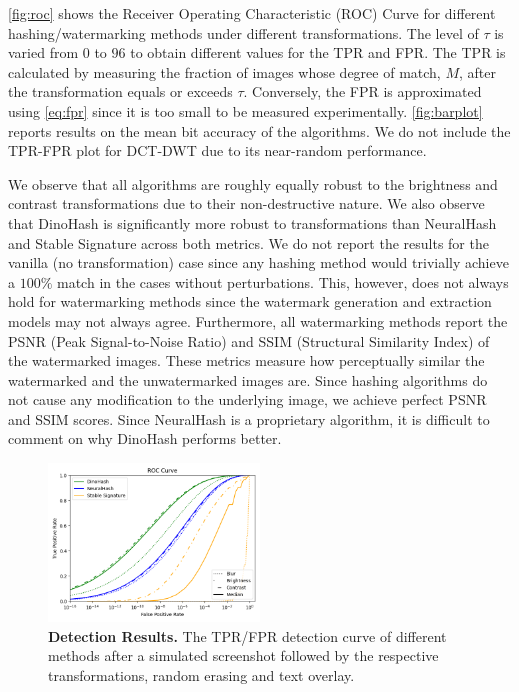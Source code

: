 \autoref{fig:roc} shows the Receiver Operating Characteristic (ROC) Curve for different hashing/watermarking methods under different transformations. The level of $\tau$ is varied from $0$ to $96$ to obtain different values for the TPR and FPR. The TPR is calculated by measuring the fraction of images whose degree of match, $M$, after the transformation equals or exceeds $\tau$. Conversely, the FPR is approximated using \autoref{eq:fpr} since it is too small to be measured experimentally. \autoref{fig:barplot} reports results on the mean bit accuracy of the algorithms. We do not include the TPR-FPR plot for DCT-DWT due to its near-random performance.

We observe that all algorithms are roughly equally robust to the brightness and contrast transformations due to their non-destructive nature. We also observe that DinoHash is significantly more robust to transformations than NeuralHash and Stable Signature across both metrics. We do not report the results for the vanilla (no transformation) case since any hashing method would trivially achieve a $100\%$ match in the cases without perturbations. This, however, does not always hold for watermarking methods since the watermark generation and extraction models may not always agree. Furthermore, all watermarking methods report the PSNR (Peak Signal-to-Noise Ratio) and SSIM (Structural Similarity Index) of the watermarked images. These metrics measure how perceptually similar the watermarked and the unwatermarked images are. Since hashing algorithms do not cause any modification to the underlying image, we achieve perfect PSNR and SSIM scores. Since NeuralHash is a proprietary algorithm, it is difficult to comment on why DinoHash performs better.
\begin{figure}[!h] 
    \centering
    \includegraphics[width=0.5\textwidth]{multi.png}
    \caption{\textbf{Detection Results.} The TPR/FPR detection curve of different methods after a simulated screenshot followed by the respective transformations, random erasing and text overlay.}
    \label{fig:roc}
    \vspace{-0.5cm}
\end{figure}


